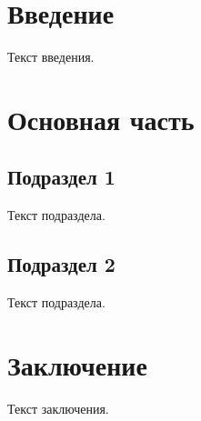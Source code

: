 

	
	\tableofcontents %
	
	\section{Введение}
	Текст введения.
	
	\section{Основная часть}
	\subsection{Подраздел 1}
	Текст подраздела.
	
	\subsection{Подраздел 2}
	Текст подраздела.
	
	\section{Заключение}
	Текст заключения.
	

